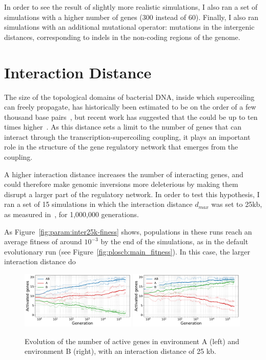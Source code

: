 In order to see the result of slightly more realistic simulations, I also ran a set of simulations with a higher number of genes (300 instead of 60).
Finally, I also ran simulations with an additional mutational operator: mutations in the intergenic distances, corresponding to indels in the non-coding regions of the genome.

\section{Interaction Distance}

The size of the topological domains of bacterial DNA, inside which supercoiling can freely propagate, has historically been estimated to be on the order of a few thousand base pairs~\citep{elhanafi2000,kouzine2013}, but recent work has suggested that the could be up to ten times higher~\citep{visser2022}.
As this distance sets a limit to the number of genes that can interact through the transcription-supercoiling coupling, it plays an important role in the structure of the gene regulatory network that emerges from the coupling.

A higher interaction distance increases the number of interacting genes, and could therefore make genomic inversions more deleterious by making them disrupt a larger part of the regulatory network.
In order to test this hypothesis, I ran a set of 15 simulations in which the interaction distance $d_{max}$ was set to 25kb, as measured in~\citep{visser2022}, for 1,000,000 generations.

As Figure~\ref{fig:param:inter25k-finess} shows, populations in these runs reach an average fitness of around $10^{-3}$ by the end of the simulations, as in the default evolutionary run (see Figure~\ref{fig:ploscb:main_fitness}).
In this case, the larger interaction distance do

\begin{figure}[H]
\centering
\includegraphics[width=0.49\textwidth]{param/interaction-25k/gene_activity_env_A.pdf}
\includegraphics[width=0.49\textwidth]{param/interaction-25k/gene_activity_env_B.pdf}
\caption[Evolution of the number of active genes in each environment with an interaction distance of 25 kb]{Evolution of the number of active genes in environment A (left) and environment B (right), with an interaction distance of 25 kb.}
\label{fig:param:inter25k-active}
\end{figure}


